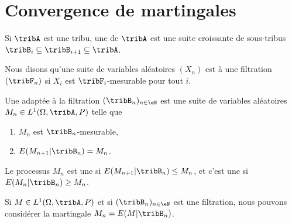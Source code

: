 
\section{Convergence de martingales}

\begin{definition}
    Si \( \tribA\) est une tribu, une  de \( \tribA\) est une suite croissante de sous-tribus \( \tribB_i\subseteq\tribB_{i+1}\subseteq\tribA\).

    Nous disons qu'une suite de variables aléatoires \( (X_n)\) est  à une filtration \( (\tribF_n)\) si \( X_i\) est \( \tribF_i\)-mesurable pour tout \( i\).
\end{definition}

\begin{definition}
    Une  adaptée à la filtration \( (\tribB_n)_{n\in \eN}\) est une suite de variables aléatoires \( M_n\in L^1(\Omega,\tribA,P)\) telle que
    \begin{enumerate}
        \item
            \( M_n\) est \( \tribB_n\)-mesurable,
        \item
            \( E(M_{n+1}|\tribB_n)=M_n\).
    \end{enumerate}

    Le processus \( M_n\) est une  si \( E(M_{n+1}|\tribB_n)\leq M_n\), et c'est une  si \( E(M_n|\tribB_n)\geq M_n\).
\end{definition}

\begin{example}
    Si \( M\in L^1(\Omega,\tribA,P)\) et si \( (\tribB_n)_{n\in \eN}\) est une filtration, nous pouvons considérer la martingale \( M_n=E(M|\tribB_n)\).
\end{example}

